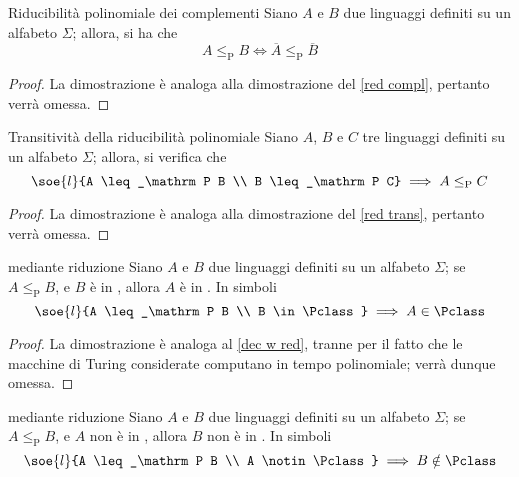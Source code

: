 \documentclass[a4paper, 12pt]{report}
\begin{document}
    \begin{framedlem}[label={p red compl}]{Riducibilità polinomiale dei complementi}
        Siano $A$ e $B$ due linguaggi definiti su un alfabeto $\Sigma$; allora, si ha che $$A \leq_\mathrm P B \iff \overline A \leq_\mathrm P \overline B$$
    \end{framedlem}

    \begin{proof}
        La dimostrazione è analoga alla dimostrazione del \cref{red compl}, pertanto verrà omessa.
    \end{proof}

    \begin{framedlem}{Transitività della riducibilità polinomiale}
        Siano $A$, $B$ e $C$ tre linguaggi definiti su un alfabeto $\Sigma$; allora, si verifica che $$\soe{l}{A \leq_\mathrm P B \\ B \leq_\mathrm P C} \implies A \leq_\mathrm P C$$
    \end{framedlem}

    \begin{proof}
        La dimostrazione è analoga alla dimostrazione del \cref{red trans}, pertanto verrà omessa.
    \end{proof}

    \begin{framedthm}[label={p w red}]{\Pclass mediante riduzione}
        Siano $A$ e $B$ due linguaggi definiti su un alfabeto $\Sigma$; se $A \leq_\mathrm P B$, e $B$ è in \Pclass, allora $A$ è in \Pclass. In simboli $$\soe{l}{A \leq_\mathrm P B \\ B \in \Pclass} \implies A \in \Pclass$$
    \end{framedthm}

    \begin{proof}
        La dimostrazione è analoga al \cref{dec w red}, tranne per il fatto che le macchine di Turing considerate computano in tempo polinomiale; verrà dunque omessa.
    \end{proof}

    \begin{framedcor}[label={p with red cor}]{\Pclass mediante riduzione}
        Siano $A$ e $B$ due linguaggi definiti su un alfabeto $\Sigma$; se $A \leq_\mathrm P B$, e $A$ non è in \Pclass, allora $B$ non è in \Pclass. In simboli $$\soe{l}{A \leq_\mathrm P B \\ A \notin \Pclass} \implies B \notin \Pclass$$
    \end{framedcor}
\end{document}
